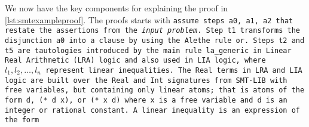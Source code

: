 We now have the key components for explaining the proof in \cref{lst:smtexampleproof}.
The proofs starts with \tt{assume} steps \tt{a0}, \tt{a1}, \tt{a2} that restate the assertions from the \emph{input problem}. %
Step \tt{t1} transforms the disjunction \texttt{a0} into a clause by using the Alethe rule \tt{or}.
Steps \tt{t2} and \tt{t5} are tautologies introduced by the main rule \tt{la\_generic}
in Linear Real Arithmetic (LRA) logic and also used in LIA logic, where \colorbox{green!30}{$l_1, l_2,\dots, l_n$} represent linear inequalities.
The \lstinline[language=SMT,basicstyle=\ttfamily\footnotesize]{Real} terms in LRA and LIA logic are built over the \lstinline[language=SMT,basicstyle=\ttfamily\footnotesize]{Real} and \lstinline[language=SMT,basicstyle=\ttfamily\footnotesize]{Int} signatures from SMT-LIB with free variables, but containing only linear atoms; that is
atoms of the form \lstinline[language=SMT,basicstyle=\ttfamily\footnotesize]{d}, \lstinline[language=SMT,basicstyle=\ttfamily\footnotesize]{(* d x)}, or \lstinline[language=SMT,basicstyle=\ttfamily\footnotesize]{(* x d)}  where \lstinline[language=SMT,basicstyle=\ttfamily\footnotesize]{x} is a free variable and  \lstinline[language=SMT,basicstyle=\ttfamily\footnotesize]{d} is an integer or rational constant.
A linear inequality is an expression of the form

